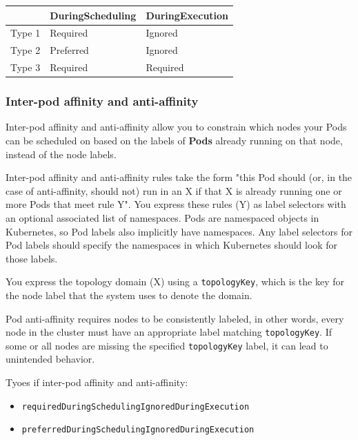 \documentclass{article}
\newenvironment{blocktemplateII}[1]{%
    \tcolorbox[beamer,%
    noparskip,breakable,
    colframe=Green,%
    colbacklower=LimeGreen!75!LightGreen,%
    title=#1]}%
    {\endtcolorbox}
\begin{document}
\begin{table}[H]
\begin{tabular}{| m{3cm} | m{4cm} | m{4cm} |}
\hline
& \textbf{DuringScheduling} & \textbf{DuringExecution} \\ \hline
Type 1 & Required & Ignored \\ \hline
Type 2 & Preferred & Ignored \\ \hline
Type 3 & Required & Required \\ \hline
\end{tabular}
\end{table}

\subsubsection{Inter-pod affinity and anti-affinity}
Inter-pod affinity and anti-affinity allow you to constrain which nodes your Pods can be scheduled on based on the labels of \textbf{Pods} already running on that node, instead of the node labels.

Inter-pod affinity and anti-affinity rules take the form "this Pod should (or, in the case of anti-affinity, should not) run in an X if that X is already running one or more Pods that meet rule Y". You express these rules (Y) as label selectors with an optional associated list of namespaces. Pods are namespaced objects in Kubernetes, so Pod labels also implicitly have namespaces. Any label selectors for Pod labels should specify the namespaces in which Kubernetes should look for those labels.

You express the topology domain (X) using a \verb|topologyKey|, which is the key for the node label that the system uses to denote the domain.

\begin{blocktemplateII}{NOTE}
Pod anti-affinity requires nodes to be consistently labeled, in other words, every node in the cluster must have an appropriate label matching \verb|topologyKey|. If some or all nodes are missing the specified \verb|topologyKey| label, it can lead to unintended behavior.
\end{blocktemplateII}

Tyoes if inter-pod affinity and anti-affinity:
\begin{itemize}
    \item \verb|requiredDuringSchedulingIgnoredDuringExecution|
    \item \verb|preferredDuringSchedulingIgnoredDuringExecution|
\end{itemize}
\end{document}
